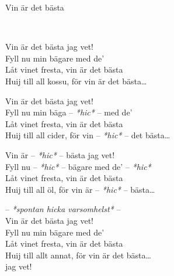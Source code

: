 \begin{song}{Vin är det bästa}

	\\
	
	Vin är det bästa jag vet!\\
	Fyll nu min bägare med de’\\
	Låt vinet fresta, vin är det bästa\\
	Huij till all kossu, för vin är det bästa\ldots

	Vin är det bästa jag vet!\\
	Fyll nu min bäga -- \emph{*hic*} -- med de’\\
	Låt vinet fresta, vin är det bästa\\
	Huij till all cider, för vin -- \emph{*hic*} -- det bästa\ldots

	Vin är -- \emph{*hic*} -- bästa jag vet!\\
	Fyll nu -- \emph{*hic*} -- bägare med de’ -- \emph{*hic*}\\
	Låt vinet fresta, vin är det bästa\\
	Huij till all öl, för vin är -- \emph{*hic*} -- bästa\ldots

	-- \emph{*spontan hicka varsomhelst*} --\\	
	Vin är det bästa jag vet!\\
	Fyll nu min bägare med de’\\
	Låt vinet fresta, vin är det bästa\\
	Huij till allt annat, för vin är det bästa\ldots\\
	jag vet!
	
\end{song}
